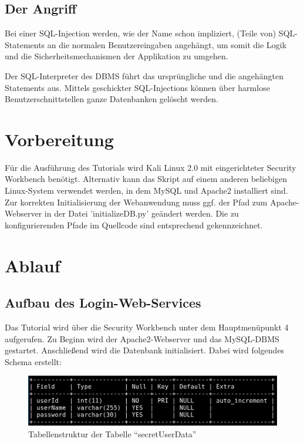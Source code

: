 \subsection{Der Angriff}
Bei einer SQL-Injection werden, wie der Name schon impliziert, (Teile von) SQL-Statements an die normalen Benutzereingaben angehängt, um somit die Logik und die Sicherheitsmechanismen der Applikation zu umgehen.

Der SQL-Interpreter des DBMS führt das ursprüngliche und die angehängten Statements aus. Mittels geschickter SQL-Injections können über harmlose Benutzerschnittstellen ganze Datenbanken gelöscht werden.

\section{Vorbereitung}
Für die Ausführung des Tutorials wird Kali Linux 2.0 mit eingerichteter Security Workbench benötigt. Alternativ kann das Skript auf einem anderen beliebigen Linux-System verwendet werden, in dem MySQL und Apache2 installiert sind. Zur korrekten Initialisierung der Webanwendung muss ggf. der Pfad zum Apache-Webserver in der Datei 'initializeDB.py' geändert werden. Die zu konfigurierenden Pfade im Quellcode sind entsprechend gekennzeichnet.

\section{Ablauf}
\subsection{Aufbau des Login-Web-Services}
Das Tutorial wird über die Security Workbench unter dem Hauptmenüpunkt 4 aufgerufen. Zu Beginn wird der Apache2-Webserver und das MySQL-DBMS gestartet. Anschließend wird die Datenbank initialisiert. Dabei wird folgendes Schema erstellt:
\begin{figure}[H]
	\centering
	\includegraphics[width=\textwidth]{images/SQL_Injection/table_secretUserData.jpg}
	\caption{Tabellenstruktur der Tabelle \enquote{secretUserData}}
	\label{fig:table_secretUserData}
\end{figure}


